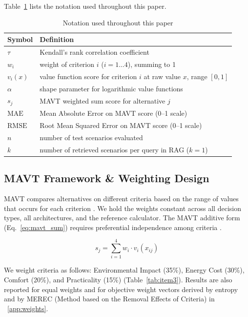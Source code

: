 \documentclass[final,3p,times]{elsarticle}
\begin{document}
Table~\ref{tab:item1} lists the notation used throughout this paper.


\begin{table}[htpb]
\centering
\begin{threeparttable}
\small
\centering
\renewcommand{\arraystretch}{1.15}
\begin{tabular}{@{} l p{} @{}}
\toprule
Symbol & Definition \\
\midrule
$\tau$ & Kendall's rank correlation coefficient \\
$w_i$ & weight of criterion $i$ ($i=1\ldots4$), summing to 1 \\
$v_i(x)$ & value function score for criterion $i$ at raw value $x$, range $[0,1]$ \\
$\alpha$ & shape parameter for logarithmic value functions \\
$s_j$ & MAVT weighted sum score for alternative $j$ \\
$\text{MAE}$ & Mean Absolute Error on MAVT score (0--1 scale) \\
$\text{RMSE}$ & Root Mean Squared Error on MAVT score (0--1 scale) \\
$n$ & number of test scenarios evaluated \\
$k$ & number of retrieved scenarios per query in RAG ($k=1$) \\
\bottomrule
\end{tabular}
\renewcommand{\arraystretch}{1.0}
\end{threeparttable}
\caption{Notation used throughout this paper}
\label{tab:item1}
\end{table}

\subsection{MAVT Framework \& Weighting Design}
\label{sec:mavt-design}
MAVT compares alternatives on different criteria based on the range of values that occurs for each criterion \cite{keeneyraiffa1976,dyer1979}. We hold the weights constant across all decision types, all architectures, and the reference calculator. The MAVT additive form (Eq.~\ref{eq:mavt_sum}) requires preferential independence among criteria \cite{dyer1979,keeneyraiffa1976}.

\begin{equation}
\label{eq:mavt_sum}
s_j = \sum_{i=1}^{4} w_i \cdot v_i(x_{ij})
\end{equation}

We weight criteria as follows: Environmental Impact (35\%), Energy Cost (30\%), Comfort (20\%), and Practicality (15\%) (Table~\ref{tab:item3}). Results are also reported for equal weights and for objective weight vectors derived by entropy and by MEREC (Method based on the Removal Effects of Criteria) \cite{merec2021} in ~\ref{app:weights}.
\end{document}
